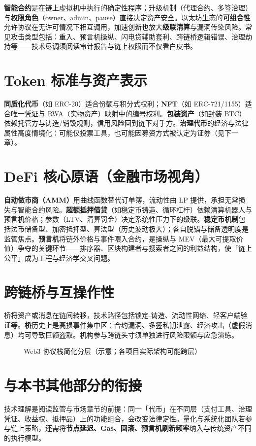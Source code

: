 \textbf{智能合约}是在链上虚拟机中执行的确定性程序；升级机制（代理合约、多签治理）与\textbf{权限角色}（owner、admin、pause）直接决定资产安全。以太坊生态的\textbf{可组合性}允许协议在无许可情况下相互调用，加速创新也放大\textbf{级联清算}与漏洞传染风险。常见攻击类型包括：重入、预言机操纵、闪电贷辅助套利、跨链桥逻辑错误、治理劫持等——技术尽调须阅读审计报告与链上权限而不仅看白皮书。

\section{Token 标准与资产表示}

\textbf{同质化代币}（如 ERC-20）适合份额与积分式权利；\textbf{NFT}（如 ERC-721/1155）适合唯一凭证与 RWA（实物资产）映射中的编号权利。\textbf{包装资产}（如封装 BTC）依赖托管方与铸造/销毁规则，信用风险回到链下对手方。\textbf{治理代币}的经济与法律属性高度情境化：可能仅投票工具，也可能因募资方式被认定为证券（见下一章）。

\section{DeFi 核心原语（金融市场视角）}

\textbf{自动做市商（AMM）}用曲线函数替代订单簿，流动性由 LP 提供，承担无常损失与智能合约风险。\textbf{超额抵押借贷}（如稳定币铸造、循环杠杆）依赖清算机器人与预言机价格；参数（LTV、清算罚金）决定系统性压力下的级联。\textbf{稳定币机制}包括法币储备型、加密抵押型、算法型（历史波动极大）；各自脱锚与储备透明度是监管焦点。\textbf{预言机}将链外价格与事件喂入合约，是操纵与 MEV（最大可提取价值）争夺的关键环节——排序器、区块构建者与搜索者之间的利益结构，使「链上公平」成为工程与经济学交叉问题。

\section{跨链桥与互操作性}

桥将资产或消息在链间转移，技术路径包括锁定-铸造、流动性网络、轻客户端验证等。\textbf{桥}历史上是高损事件集中区：合约漏洞、多签私钥泄露、经济攻击（虚假消息）均可导致巨额盗取。机构参与跨链头寸须单独进行风险限额与应急演练。

\begin{figure}[htbp]
\centering
{}
\caption{Web3 协议栈简化分层（示意；各项目实际架构可能跨层）}
\label{fig:web3-stack}
\end{figure}

\section{与本书其他部分的衔接}

技术理解是阅读监管与市场章节的前提：同一「代币」在不同层（支付工具、治理凭证、收益权、抵押品）上的功能组合，会改变法律定性。量化与系统化团队若参与链上策略，还需将\textbf{节点延迟、Gas、回滚、预言机刷新频率}纳入与传统资产不同的执行模型。
